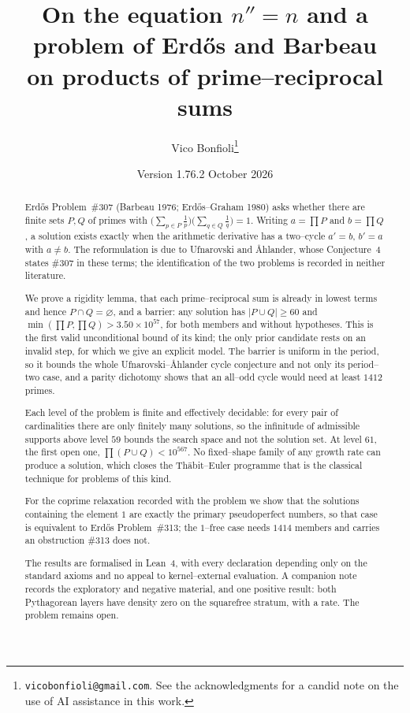 \documentclass[11pt]{article}
\title{On the equation $n''=n$ and a problem of Erd\H{o}s and Barbeau \\
       on products of prime--reciprocal sums}
\author{Vico Bonfioli\thanks{\texttt{vicobonfioli@gmail.com}.
  See the acknowledgments for a candid note on the use of AI assistance in this work.}}
\date{Version 1.76.2\quad 18 October 2026}
\theoremstyle{definition}
\begin{document}
\maketitle

\begin{abstract}
Erd\H{o}s Problem~\#307 (Barbeau 1976; Erd\H{o}s--Graham 1980) asks whether there are finite sets
$P,Q$ of primes with $\bigl(\sum_{p\in P}\tfrac1p\bigr)\bigl(\sum_{q\in Q}\tfrac1q\bigr)=1$.
Writing $a=\prod P$ and $b=\prod Q$, a solution exists exactly when the arithmetic derivative has a
two--cycle $a'=b$, $b'=a$ with $a\neq b$. The reformulation is due to Ufnarovski and \AA hlander,
whose Conjecture~4 states \#307 in these terms; the identification of the two problems is recorded
in neither literature.

We prove a rigidity lemma, that each prime--reciprocal sum is already in lowest terms and hence
$P\cap Q=\varnothing$, and a barrier: any solution has $|P\cup Q|\ge60$ and
$\min(\prod P,\prod Q)>3.50\times10^{57}$, for both members and without hypotheses. This is the
first valid unconditional bound of its kind; the only prior candidate rests on an invalid step, for
which we give an explicit model. The barrier is uniform in the period, so it bounds the whole
Ufnarovski--\AA hlander cycle conjecture and not only its period--two case, and a parity dichotomy
shows that an all--odd cycle would need at least $1412$ primes.

Each level of the problem is finite and effectively decidable: for every pair of cardinalities there
are only finitely many solutions, so the infinitude of admissible supports above level $59$ bounds
the search space and not the solution set. At level $61$, the first open one,
$\prod(P\cup Q)<10^{567}$. No fixed--shape family of any growth rate can produce a solution, which
closes the Th\=abit--Euler programme that is the classical technique for problems of this kind.

For the coprime relaxation recorded with the problem we show that the solutions containing the
element $1$ are exactly the primary pseudoperfect numbers, so that case is equivalent to Erd\H{o}s
Problem~\#313; the $1$--free case needs $1414$ members and carries an obstruction \#313 does not.

The results are formalised in Lean~4, with every declaration depending only on the standard axioms
and no appeal to kernel--external evaluation. A companion note records the exploratory and negative
material, and one positive result: both Pythagorean layers have density zero on the squarefree
stratum, with a rate. The problem remains open.
\end{abstract}
\end{document}
